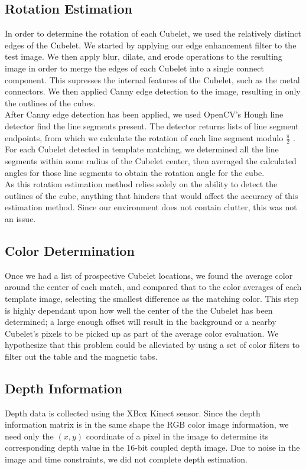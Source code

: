 \documentclass[conference]{IEEEtran}
\begin{document}
\subsection{Rotation Estimation}
In order to determine the rotation of each Cubelet, we used the relatively distinct edges of the Cubelet.  We started by applying our edge enhancement filter to the test image.  We then apply blur, dilate, and erode operations to the resulting image in order to merge the edges of each Cubelet into a single connect component.  This supresses the internal features of the Cubelet, such as the metal connectors. We then applied Canny edge detection to the image, resulting in only the outlines of the cubes.  \\

After Canny edge detection has been applied, we used OpenCV's Hough line detector find the line segments present.  The detector returns lists of line segment endpoints, from which we calculate the rotation of each line segment modulo $ \frac{\pi}{2}$ .  For each Cubelet detected in template matching, we determined all the line segments within some radius of the Cubelet center, then averaged the calculated angles for those line segments to obtain the rotation angle for the cube. \\

As this rotation estimation method relies solely on the ability to detect the outlines of the cube, anything that hinders that would  affect the accuracy of this estimation method. Since our environment does not contain clutter, this was not an issue.

\subsection{Color Determination}
Once we had a list of prospective Cubelet locations, we found the average color around the center of each match, and compared that to the color averages of each template image, selecting the smallest difference as the matching color.  This step is highly dependant upon how well the center of the the Cubelet has been determined; a large enough offset will result in the background or a nearby Cubelet's pixels to be picked up as part of the average color evaluation. We hypothesize that this problem could be alleviated by using a set of color filters to filter out the table and the magnetic tabs.

\subsection{Depth Information}
Depth data is collected using the XBox Kinect sensor.  Since the depth information matrix is in the same shape the RGB color image information, we need only the $(x,y)$ coordinate of a pixel in the image to determine its corresponding depth value in the 16-bit coupled depth image. Due to noise in the image and time constraints, we did not complete depth estimation.
\end{document}
